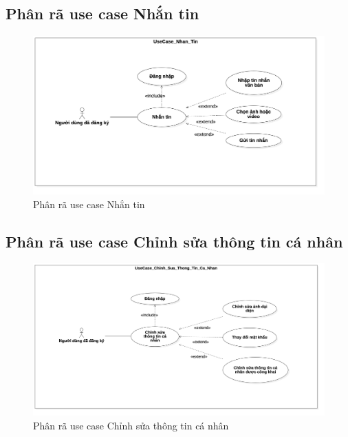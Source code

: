 \documentclass[../DoAn.tex]{subfiles}
\begin{document}
\subsection{Phân rã use case Nhắn tin}
\begin{figure}[H]
    \centering
    \includegraphics[width=1\linewidth]{Hinhve/UseCase/UseCase_Nhan_Tin.png}
    \caption{Phân rã use case Nhắn tin}
   \label{fig:use_case_tim_kiem}
\end{figure}

\subsection{Phân rã use case Chỉnh sửa thông tin cá nhân}
\begin{figure}[H]
    \centering
    \includegraphics[width=1\linewidth]{Hinhve/UseCase/UseCase_Chinh_Sua_Thong_Tin_Ca_Nhan.png}
    \caption{Phân rã use case Chỉnh sửa thông tin cá nhân}
   \label{fig:use_case_tim_kiem}
\end{figure}
\end{document}
